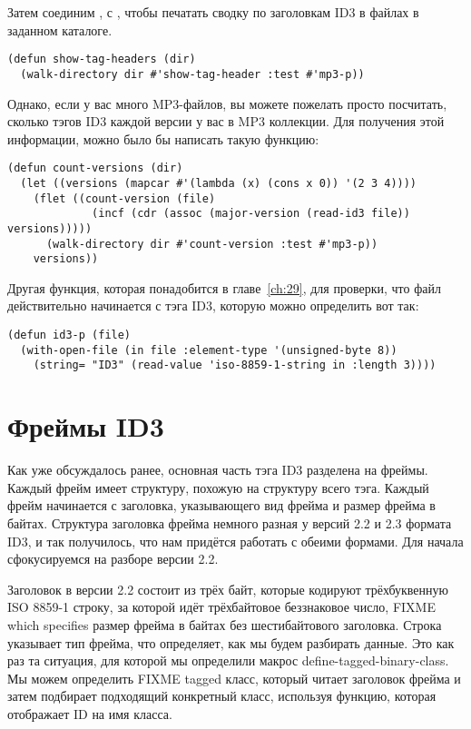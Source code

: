 Затем соединим ,  с , чтобы
печатать сводку по заголовкам ID3 в файлах в заданном каталоге.

\begin{lstlisting}
(defun show-tag-headers (dir) 
  (walk-directory dir #'show-tag-header :test #'mp3-p))
\end{lstlisting}

Однако, если у вас много MP3-файлов, вы можете пожелать просто посчитать, сколько тэгов
ID3 каждой версии у вас в MP3 коллекции.  Для получения этой информации, можно было бы
написать такую функцию:

\begin{lstlisting}
(defun count-versions (dir)
  (let ((versions (mapcar #'(lambda (x) (cons x 0)) '(2 3 4))))
    (flet ((count-version (file)
             (incf (cdr (assoc (major-version (read-id3 file)) versions)))))
      (walk-directory dir #'count-version :test #'mp3-p))
    versions))
\end{lstlisting}

Другая функция, которая понадобится в главе~\ref{ch:29}, для проверки, что файл
действительно начинается с тэга ID3, которую можно определить вот так:

\begin{lstlisting}
(defun id3-p (file)
  (with-open-file (in file :element-type '(unsigned-byte 8))
    (string= "ID3" (read-value 'iso-8859-1-string in :length 3))))
\end{lstlisting}

\section{Фреймы ID3}

Как уже обсуждалось ранее, основная часть тэга ID3 разделена на фреймы.  Каждый фрейм
имеет структуру, похожую на структуру всего тэга.  Каждый фрейм начинается с заголовка,
указывающего вид фрейма и размер фрейма в байтах.  Структура заголовка фрейма немного
разная у версий 2.2 и 2.3 формата ID3, и так получилось, что нам придётся работать с
обеими формами. Для начала сфокусируемся на разборе версии 2.2.

Заголовок в версии 2.2 состоит из трёх байт, которые кодируют трёхбуквенную ISO 8859-1
строку, за которой идёт трёхбайтовое беззнаковое число, FIXME which specifies размер
фрейма в байтах без шестибайтового заголовка.  Строка указывает тип фрейма, что
определяет, как мы будем разбирать данные.  Это как раз та ситуация, для которой мы
определили макрос define-tagged-binary-class.  Мы можем определить FIXME tagged класс,
который читает заголовок фрейма и затем подбирает подходящий конкретный класс, используя
функцию, которая отображает ID на имя класса.

